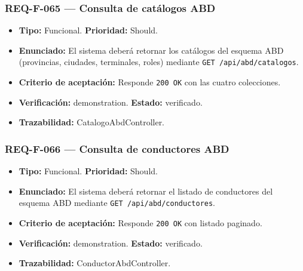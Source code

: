 \documentclass[12pt,a4paper]{article}
\begin{document}
\subsubsection{REQ-F-065 --- Consulta de catálogos ABD}
\begin{itemize}
  \item \textbf{Tipo:} Funcional. \textbf{Prioridad:} Should.
  \item \textbf{Enunciado:} El sistema deberá retornar los catálogos del esquema ABD (provincias, ciudades, terminales, roles) mediante \texttt{GET /api/abd/catalogos}.
  \item \textbf{Criterio de aceptación:} Responde \texttt{200 OK} con las cuatro colecciones.
  \item \textbf{Verificación:} demonstration. \textbf{Estado:} verificado.
  \item \textbf{Trazabilidad:} CatalogoAbdController.
\end{itemize}

\subsubsection{REQ-F-066 --- Consulta de conductores ABD}
\begin{itemize}
  \item \textbf{Tipo:} Funcional. \textbf{Prioridad:} Should.
  \item \textbf{Enunciado:} El sistema deberá retornar el listado de conductores del esquema ABD mediante \texttt{GET /api/abd/conductores}.
  \item \textbf{Criterio de aceptación:} Responde \texttt{200 OK} con listado paginado.
  \item \textbf{Verificación:} demonstration. \textbf{Estado:} verificado.
  \item \textbf{Trazabilidad:} ConductorAbdController.
\end{itemize}
\end{document}
